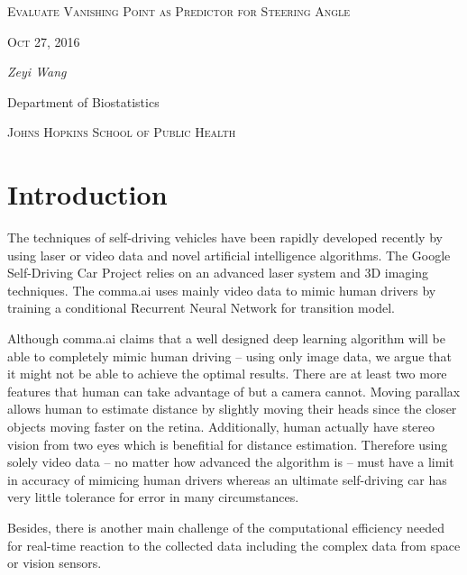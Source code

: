 \documentclass[11pt, oneside]{article}
\begin{document}
\begin{titlepage}
	\centering
	{\scshape\LARGE Evaluate Vanishing Point as Predictor for Steering Angle \par}
	\vspace{1cm}
	{\scshape\Large Oct 27, 2016\par}
	\vspace{2cm}
	{\Large\itshape Zeyi Wang\par}
	Department of Biostatistics\par
	\textsc{Johns Hopkins School of Public Health}

	\vfill

\end{titlepage}



\section*{Introduction}

The techniques of self-driving vehicles have been rapidly developed recently by using laser or video data and novel artificial intelligence algorithms. The Google Self-Driving Car Project 
\cite{google} relies on an advanced laser system and 3D imaging techniques. The comma.ai
\cite{comma.ai} 
uses mainly video data to mimic human drivers by 
training a conditional Recurrent Neural Network for transition model. 

Although comma.ai claims that a well designed deep learning algorithm will be able to completely mimic human driving -- using only image data, we argue that it might not be able to achieve the optimal results. There are at least two more features that human can take advantage of but a camera cannot. Moving parallax allows human to estimate distance by slightly moving their heads since the closer objects moving faster on the retina. Additionally, human actually have stereo vision from two eyes which is benefitial for distance estimation. Therefore using solely video data -- no matter how advanced the algorithm is -- must have a limit in accuracy of mimicing human drivers whereas an ultimate self-driving car has very little tolerance for error in many circumstances. 

Besides, there is another main challenge of the computational efficiency needed for real-time reaction to the collected data including the complex data from space or vision sensors. 
\end{document}
